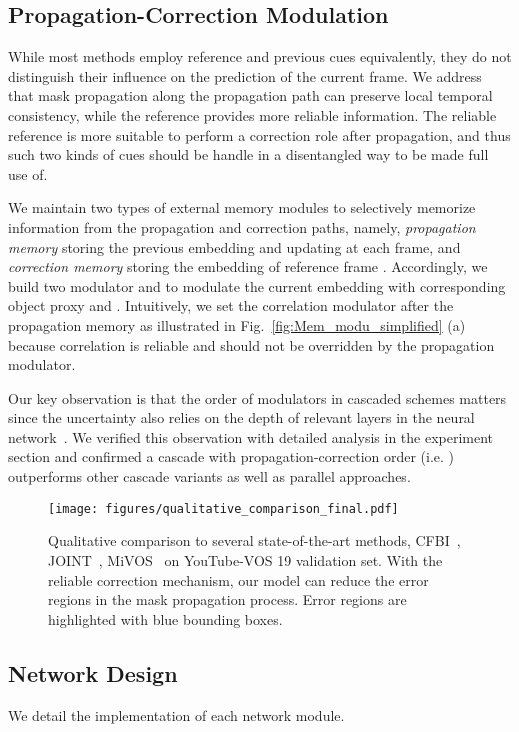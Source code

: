 \documentclass[letterpaper]{article} \usepackage{aaai22}  \usepackage{times}  \usepackage{helvet}  \usepackage{courier}  \usepackage[hyphens]{url}  \usepackage{graphicx} \urlstyle{rm} \def\UrlFont{\rm}  \usepackage{natbib}  \usepackage{caption} \DeclareCaptionStyle{ruled}{labelfont=normalfont,labelsep=colon,strut=off} \frenchspacing  \setlength{\pdfpagewidth}{8.5in}  \setlength{\pdfpageheight}{11in}  \usepackage{algorithm}
\newcommand{\fig}[1]{Fig.~#1}
\begin{document}
 \subsection{Propagation-Correction Modulation}

While most methods \cite{oh2019video,seong2020kernelized,lu2020video} employ reference and previous cues equivalently, they do not distinguish their influence on the prediction of the current frame. We address that mask propagation along the propagation path can preserve local temporal consistency, while the reference provides more reliable information. The reliable reference is more suitable to perform a correction role after propagation, and thus such two kinds of cues should be handle in a disentangled way to be made full use of.

We maintain two types of external memory modules to selectively memorize information from the propagation and correction paths, namely, \textit{propagation memory} storing the previous embedding  and updating at each frame, and \textit{correction memory} storing the embedding of reference frame .
Accordingly, we build two modulator  and  to modulate the current embedding with corresponding object proxy  and .
Intuitively, we set the correlation modulator after the propagation memory as illustrated in \fig{\ref{fig:Mem_modu_simplified}} (a) because correlation is reliable and should not be overridden by the propagation modulator.

Our key observation is that the order of modulators in cascaded schemes matters since the uncertainty also relies on the depth of relevant layers in the neural network~\cite{goldfeld2019estimating}.
We verified this observation with detailed analysis in the experiment section and confirmed a cascade with propagation-correction order (i.e. ) outperforms other cascade variants as well as parallel approaches.
\begin{figure*}[ht!]
	\centering
	\texttt{[image: figures/qualitative\_comparison\_final.pdf]}
\caption{Qualitative comparison to several state-of-the-art methods, CFBI~\cite{yang2020collaborative}, JOINT~\cite{mao2021joint}, MiVOS~\cite{cheng2021mivos} on YouTube-VOS 19 validation set. With the reliable correction mechanism, our model can reduce the error regions in the mask propagation process. Error regions are highlighted with blue bounding boxes.}
	\label{fig:qualitative_comparison}
\end{figure*} \subsection{Network Design}
We detail the implementation of each network module.
\end{document}

